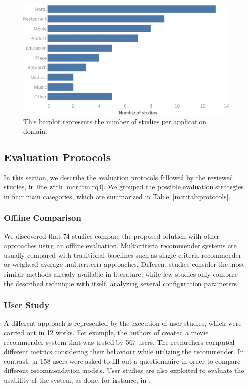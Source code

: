 \begin{figure}
\centering
\includegraphics[width=\textwidth]{domain_per_study}
\caption[Studies per application domain]{This barplot represents the number of studies per application domain.}
\label{mcr:fig:domain-per-study}
\end{figure}

\subsection{Evaluation Protocols}
\label{mcr:sec:protocols}

In this section, we describe the evaluation protocols followed by the reviewed studies, in line with \ref{mcr:itm:rq6}. We grouped the possible evaluation strategies in four main categories, which are summarized in Table~\ref{mcr:tab:protocols}.

\subsubsection{Offline Comparison}

We discovered that 74 studies compare the proposed solution with other approaches using an offline evaluation. Multicriteria recommender systems are usually compared with traditional baselines such as single-criteria recommender or weighted average multicriteria approaches. Different studies consider the most similar methods already available in literature, while few studies only compare the described technique with itself, analyzing several configuration parameters.

\subsubsection{User Study}

A different approach is represented by the execution of user studies, which were carried out in 12 works. For example, the authors of  created a movie recommender system that was tested by 567 users. The researchers computed different metrics considering their behaviour while utilizing the recommender. In contrast, in  158 users were asked to fill out a questionnaire in order to compare different recommendation models. User studies are also exploited to evaluate the usability of the system, as done, for instance, in .


